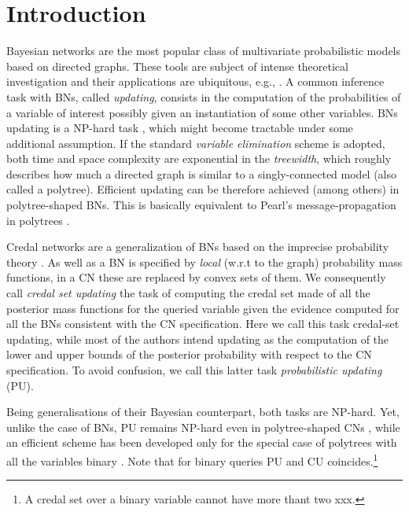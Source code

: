 \section{Introduction}\label{sec:intro}
Bayesian networks \citep[BNs]{2009:koller} are the most popular class of multivariate probabilistic models based on directed graphs. These tools are subject of intense theoretical investigation and their applications are ubiquitous, e.g., \cite{landuyt2013,de2013}. A common inference task with BNs, called \emph{updating}, consists in the computation of the probabilities of a variable of interest possibly given an instantiation of some other variables. BNs updating is a NP-hard task \citep{cooper1990}, which might become tractable under some additional assumption. If the standard \emph{variable elimination} \citep[VE]{kohlas} scheme is adopted, both time and space complexity are exponential in the \emph{treewidth}, which roughly describes how much a directed graph is similar to a singly-connected model (also called a polytree). Efficient updating can be therefore achieved (among others) in polytree-shaped BNs. This is basically equivalent to Pearl's message-propagation in polytrees \cite{pearl}.

Credal networks \citep[CNs]{cozman2000a} are a generalization of BNs based on the imprecise probability theory \citep{walley1991}. As well as a BN is specified by \emph{local} (w.r.t to the graph) probability mass functions, in a CN these are replaced by convex sets of them. We consequently call \emph{credal set updating} the task of  computing the credal set made of all the posterior mass functions for the queried variable given the evidence computed for all the BNs consistent with the CN specification. Here we call this task credal-set updating, while most of the authors intend updating as the computation of the lower and upper bounds of the posterior probability with respect to the CN specification. To avoid confusion, we call this latter task \emph{probabilistic updating} (PU). 

Being generalisations of their Bayesian counterpart, both tasks are NP-hard. Yet, unlike the case of BNs, PU remains NP-hard even in polytree-shaped CNs \citep{maua2014}, while an efficient scheme has been developed only for the special case of polytrees with all the variables binary \citep{fagiuoli1998a}. Note that for binary queries PU and CU coincides.\footnote{A credal set over a binary variable cannot have more thant two xxx.}

